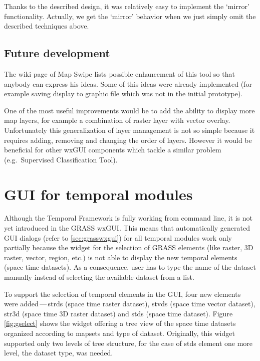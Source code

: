 \documentclass[a4paper,12pt,oneside]{book}
\newcommand{\tf}{Temporal Framework\xspace}
\newcommand{\ms}{Map Swipe\xspace}
\newcommand{\dash}{\mbox{\,---\,}}
\begin{document}
Thanks to the described design, it was relatively easy to implement the `mirror' functionality.
Actually, we get the `mirror' behavior when we just simply omit the described techniques above.

\subsection{Future development}
The wiki page \cite{mapswipeWiki} of \ms lists possible enhancement of this tool
so that anybody can express his ideas. Some of this ideas were already implemented
(for example saving display to graphic file which was not in the initial prototype).

One of the most useful improvements would be to add the ability to display
more map layers, for example a combination of raster layer with vector overlay.
Unfortunately this generalization of layer management is not so simple
because it requires adding, removing and changing the order of layers.
However it would be beneficial for other wxGUI components which tackle a similar problem
(e.g.\ Supervised Classification Tool).

\section{GUI for temporal modules}
Although the \tf is fully working from command line, it is not yet introduced in the GRASS wxGUI.
This means that automatically generated GUI dialogs (refer to \ref{sec:grasswxgui})
for all temporal modules work only partially because the widget for the selection of GRASS elements
(like raster, 3D raster, vector, region, etc.) is not able to display the new temporal elements
(space time datasets). As a consequence, user has to type the name of the dataset manually
instead of selecting the available dataset from a list.

To support the selection of temporal elements in the GUI, four new elements were
added\dash strds (space time raster dataset), stvds (space time vector dataset),
str3d (space time 3D raster dataset) and stds (space time dataset).
Figure \ref{fig:gselect} shows the widget offering a tree view of the space time datasets
organized according to mapsets and type of dataset.
Originally, this widget supported only two levels of tree structure,
for the case of stds element one more level, the dataset type, was needed.
\end{document}
